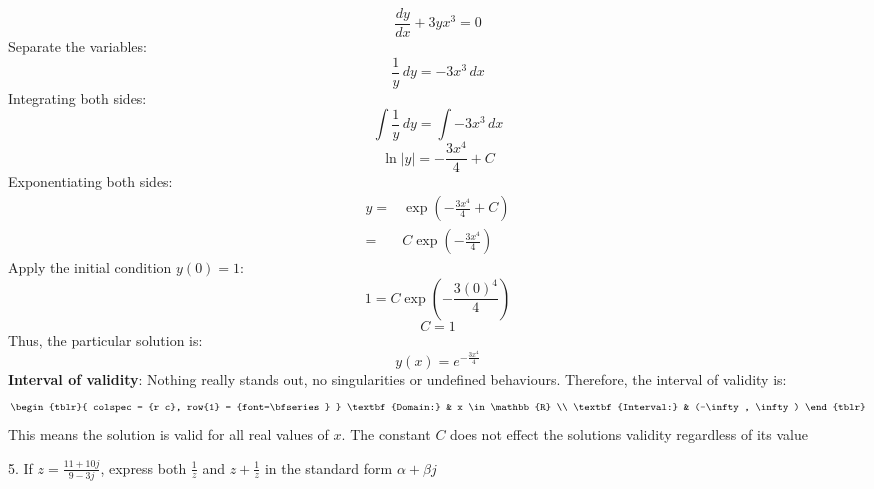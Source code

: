 \documentclass[a4paper, 12pt]{report}
\def\ni{green!60!black!40!white}
\begin{document}
    \[\frac{dy}{dx} + 3y x^3 = 0\]
    Separate the variables:
    \[\frac{1}{y} \, dy = -3x^3 \, dx\]
    Integrating both sides:
    \[\int \frac{1}{y} \, dy = \int -3x^3 \, dx\]
    \[\ln|y| = -\frac{3x^4}{4} + C\]
    Exponentiating both sides:
    \begin{align*}
        y=&\exp\left(-\frac{3x^4}{4} + C\right)\\
            =&C \exp\left(-\frac{3x^4}{4}\right)
    \end{align*}
    Apply the initial condition \( y(0) = 1 \):
    \[1 = C \exp\left(-\frac{3(0)^4}{4}\right)\]
    \[C = 1\]
    Thus, the particular solution is:
    \[\boxed{y(x) = e^{-\frac{3x^4}{4}}}\]
    \textbf{Interval of validity}: Nothing really stands out, no singularities or undefined behaviours. Therefore, the interval of validity is:
    \[
    \begin{tblr}{
            colspec = {r c},
            row{1} = {font=\bfseries}
        }
        \textbf{Domain:} & x \in \mathbb{R} \\
        \textbf{Interval:} & (-\infty, \infty)
    \end{tblr}
    \]
    This means the solution is valid for all real values of \(x\). The constant \(C\) does not effect the solutions validity regardless of its value
    
    \newpage
    
    \begin{tcolorbox}[title={\color{black}\section{Q5}}, colback=white, colframe=\ni, boxrule=1mm, width=1\textwidth]
        5. If \( z = \frac{11 + 10{j}}{9 - 3{j}} \), express both \( \frac{1}{z} \) and \( z + \frac{1}{z} \) in the standard form \( \alpha + \beta {j} \)
    \end{tcolorbox}
    
\end{document}
